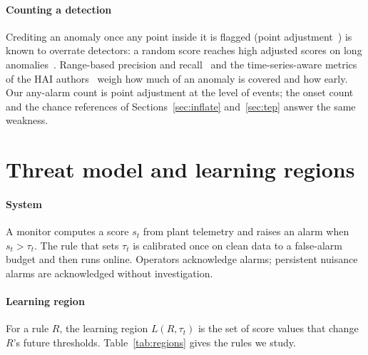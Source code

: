 \documentclass[letterpaper,twocolumn,10pt]{article}
\begin{document}
\paragraph{Counting a detection}
Crediting an anomaly once any point inside it is flagged (point adjustment~\cite{xu2018vae}) is known
to overrate detectors: a random score reaches high adjusted scores on long
anomalies~\cite{kim2022rigorous}. Range-based precision and recall~\cite{tatbul2018precision} and the
time-series-aware metrics of the HAI authors~\cite{hwang2019tapr} weigh how much of an anomaly is covered
and how early. Our any-alarm count is point adjustment at the level of events; the onset count and the
chance references of Sections~\ref{sec:inflate} and~\ref{sec:tep} answer the same weakness.

\section{Threat model and learning regions}
\label{sec:threat}

\paragraph{System}
A monitor computes a score $s_t$ from plant telemetry and raises an alarm when $s_t > \tau_t$. The
rule that sets $\tau_t$ is calibrated once on clean data to a false-alarm budget and then runs
online. Operators acknowledge alarms; persistent nuisance alarms are acknowledged without
investigation.

\paragraph{Learning region}
For a rule $R$, the learning region $L(R, \tau_t)$ is the set of score values that change $R$'s
future thresholds. Table~\ref{tab:regions} gives the rules we study.
\end{document}
